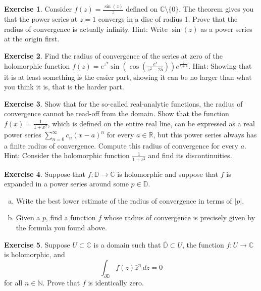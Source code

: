 \documentclass[12pt,openany]{book}
\newcommand{\sabs}[1]{\lvert {#1} \rvert}
\newcommand{\C}{{\mathbb{C}}}
\newcommand{\R}{{\mathbb{R}}}
\newcommand{\N}{{\mathbb{N}}}
\newcommand{\D}{{\mathbb{D}}}
\theoremstyle{plain}
\theoremstyle{remark}
\theoremstyle{definition}
\newenvironment{exbox}{%
    \def\FrameCommand{\vrule width 1pt \relax\hspace{10pt}}%
    \MakeFramed{\advance\hsize-\width\FrameRestore}%
}{%
    \endMakeFramed
}
\newenvironment{exparts}{%
    \leavevmode\begin{enumerate}[a),noitemsep,topsep=0pt,parsep=0pt,partopsep=0pt]
}{%
    \end{enumerate}
}
\theoremstyle{exercise}
\newtheorem{exercise}{Exercise}[section]
\theoremstyle{example}
\begin{document}
\begin{exbox}
\begin{exercise}
Consider $f(z) = \frac{\sin(z)}{z}$ defined on $\C \setminus \{ 0 \}$.
The theorem gives you that the power series at $z=1$ convergs in a disc of
radius 1.  Prove that the radius of convergence is actually infinity.  Hint:
Write $\sin(z)$ as a power series at the origin first.
\end{exercise}

\begin{exercise}
Find the radius of convergence of the series at zero of the holomorphic
function $f(z) =
e^{z^7}\sin\left(\cos\left(\frac{e^z}{z^2-25}\right)\right)e^{\frac{z}{z+4}}$.
Hint: Showing that it is at least something is the easier part, showing it
can be no larger than what you think it is, that is the harder part.
\end{exercise}

\begin{exercise}
\pagebreak[2]
Show that for the so-called real-analytic functions, the radius of
convergence cannot be read-off from the domain.
Show that the function $f(x) = \frac{1}{1+x^2}$,
which is defined on the
entire real line, can be expressed as a real power series
$\sum_{n=0}^\infty c_n {(x-a)}^n$ for every $a \in \R$, but
this power series always has a finite radius of convergence.
Compute this radius of convergence for every $a$.  Hint: Consider
the holomorphic function $\frac{1}{1+z^2}$ and find its discontinuities.
\end{exercise}

\begin{exercise}
Suppose that $f \colon \D \to \C$ is holomorphic and suppose that
$f$ is expanded in a power series around some $p \in \D$.
\begin{exparts}
\item
Write the best lower estimate of the radius of convergence in terms of
$\sabs{p}$.
\item
Given a $p$, find a function $f$ whose radius of convergence is precisely
given by the formula you found above.
\end{exparts}
\end{exercise}

\begin{exercise}
Suppose $U \subset \C$ is a domain such that $\overline{\D} \subset U$,
the function $f \colon U \to \C$ is holomorphic, and
\begin{equation*}
\int_{\partial \D} f(z) \bar{z}^n \, dz = 0
\end{equation*}
for all $n \in \N$.  Prove that $f$ is identically zero.
\end{exercise}


\end{exbox}
\end{document}
